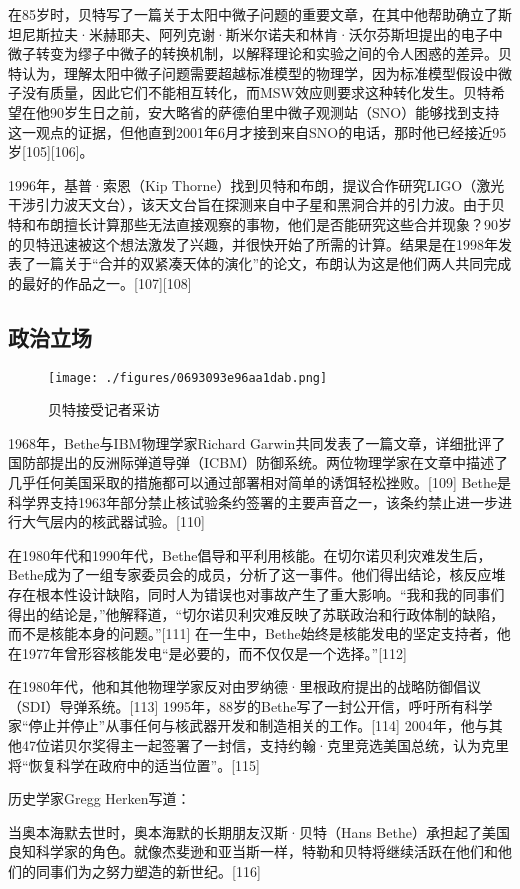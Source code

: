 在85岁时，贝特写了一篇关于太阳中微子问题的重要文章，在其中他帮助确立了斯坦尼斯拉夫·米赫耶夫、阿列克谢·斯米尔诺夫和林肯·沃尔芬斯坦提出的电子中微子转变为缪子中微子的转换机制，以解释理论和实验之间的令人困惑的差异。贝特认为，理解太阳中微子问题需要超越标准模型的物理学，因为标准模型假设中微子没有质量，因此它们不能相互转化，而MSW效应则要求这种转化发生。贝特希望在他90岁生日之前，安大略省的萨德伯里中微子观测站（SNO）能够找到支持这一观点的证据，但他直到2001年6月才接到来自SNO的电话，那时他已经接近95岁[105][106]。

1996年，基普·索恩（Kip Thorne）找到贝特和布朗，提议合作研究LIGO（激光干涉引力波天文台），该天文台旨在探测来自中子星和黑洞合并的引力波。由于贝特和布朗擅长计算那些无法直接观察的事物，他们是否能研究这些合并现象？90岁的贝特迅速被这个想法激发了兴趣，并很快开始了所需的计算。结果是在1998年发表了一篇关于“合并的双紧凑天体的演化”的论文，布朗认为这是他们两人共同完成的最好的作品之一。[107][108]
\subsection{政治立场}
\begin{figure}[ht]
\centering
\texttt{[image: ./figures/0693093e96aa1dab.png]}
\caption{贝特接受记者采访} \label{fig_Hans_6}
\end{figure}
1968年，Bethe与IBM物理学家Richard Garwin共同发表了一篇文章，详细批评了国防部提出的反洲际弹道导弹（ICBM）防御系统。两位物理学家在文章中描述了几乎任何美国采取的措施都可以通过部署相对简单的诱饵轻松挫败。[109] Bethe是科学界支持1963年部分禁止核试验条约签署的主要声音之一，该条约禁止进一步进行大气层内的核武器试验。[110]

在1980年代和1990年代，Bethe倡导和平利用核能。在切尔诺贝利灾难发生后，Bethe成为了一组专家委员会的成员，分析了这一事件。他们得出结论，核反应堆存在根本性设计缺陷，同时人为错误也对事故产生了重大影响。“我和我的同事们得出的结论是，”他解释道，“切尔诺贝利灾难反映了苏联政治和行政体制的缺陷，而不是核能本身的问题。”[111] 在一生中，Bethe始终是核能发电的坚定支持者，他在1977年曾形容核能发电“是必要的，而不仅仅是一个选择。”[112]

在1980年代，他和其他物理学家反对由罗纳德·里根政府提出的战略防御倡议（SDI）导弹系统。[113] 1995年，88岁的Bethe写了一封公开信，呼吁所有科学家“停止并停止”从事任何与核武器开发和制造相关的工作。[114] 2004年，他与其他47位诺贝尔奖得主一起签署了一封信，支持约翰·克里竞选美国总统，认为克里将“恢复科学在政府中的适当位置”。[115]

历史学家Gregg Herken写道：

当奥本海默去世时，奥本海默的长期朋友汉斯·贝特（Hans Bethe）承担起了美国良知科学家的角色。就像杰斐逊和亚当斯一样，特勒和贝特将继续活跃在他们和他们的同事们为之努力塑造的新世纪。[116]
